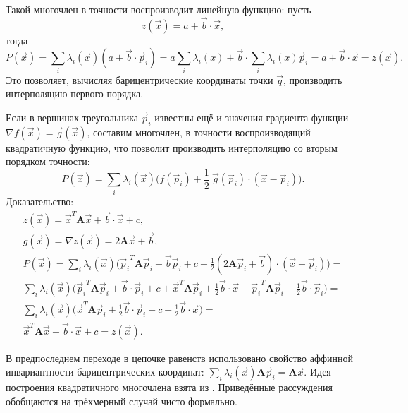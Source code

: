 Такой многочлен в точности воспроизводит линейную функцию: пусть
\begin{equation}
z(\vec{x}) = a + \vec{b} \cdot \vec{x},
\end{equation}
тогда
\begin{equation}
P(\vec{x}) = \sum_{i} \lambda_i({\vec{x}}) (a + \vec{b} \cdot \vec{p}_i) = 
	a \sum_{i} \lambda_i(x) + \vec{b} \cdot \sum_{i} \lambda_i(x) \vec{p}_i = 
	a + \vec{b} \cdot \vec{x} = z(\vec{x}).
\end{equation}
Это позволяет, вычисляя барицентрические координаты точки $\vec{q}$, производить интерполяцию 
первого порядка.

Если в вершинах треугольника $\vec{p}_i$ известны ещё и значения градиента функции 
$\nabla f(\vec{x}) = \vec{g}(\vec{x})$, 
составим многочлен, в точности воспроизводящий квадратичную функцию, 
что позволит производить интерполяцию со вторым порядком точности:
\begin{equation}
P(\vec{x}) = \sum_{i} \lambda_i(\vec{x}) \Big(f(\vec{p}_i) + \frac{1}{2} \ \vec{g}(\vec{p}_i) \cdot (\vec{x} - \vec{p}_i) \Big).
\end{equation}
Доказательство:
\begin{align}
z(\vec{x}) = \vec{x}^T \mathbf{A} \vec{x} + \vec{b} \cdot \vec{x} + c, \\
g(\vec{x}) = \nabla z(\vec{x}) = 2 \mathbf{A} \vec{x} + \vec{b}, \\
P(\vec{x}) = \sum_{i} \lambda_i({\vec{x}}) \Big( {\vec{p}_i}^T \mathbf{A} \vec{p}_i + \vec{b} \vec{p}_i + c + \frac{1}{2} (2\mathbf{A}\vec{p}_i + \vec{b}) \cdot (\vec{x} - \vec{p}_i) \Big) = \\
\sum_{i} \lambda_i({\vec{x}}) \Big( {\vec{p}_i}^T \mathbf{A} \vec{p}_i + \vec{b} \cdot \vec{p}_i + c + {\vec{x}}^T \mathbf{A} \vec{p}_i + \frac{1}{2} \vec{b} \cdot \vec{x} - {\vec{p}_i}^T \mathbf{A} \vec{p}_i - \frac{1}{2} \vec{b} \cdot \vec{p}_i  \Big) = \\
\sum_{i} \lambda_i({\vec{x}}) \Big( {\vec{x}}^T \mathbf{A} \vec{p}_i + \frac{1}{2} \vec{b} \cdot \vec{p}_i + c + \frac{1}{2} \vec{b} \cdot \vec{x}  \Big) = \\
\vec{x}^T \mathbf{A} \vec{x} + \vec{b} \cdot \vec{x} + c = z(\vec{x}).
\end{align}

В предпоследнем переходе в цепочке равенств использовано свойство аффинной инвариантности 
барицентрических координат: $\sum_{i} \lambda_i(\vec{x}) \mathbf{A} \vec{p}_i = \mathbf{A} \vec{x}$.
Идея построения квадратичного многочлена взята из \cite{cgal_interpolation}. 
Приведённые рассуждения обобщаются на трёхмерный случай чисто формально.


